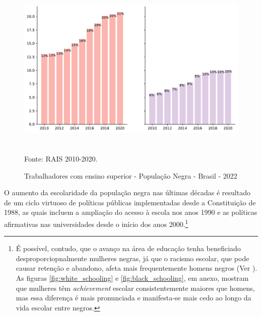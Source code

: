 \documentclass[12pt]{article}
\begin{document}
\begin{figure}[H]
    \centering
    \caption{Trabalhadores com ensino superior - População Negra - Brasil - 2022}
        \includegraphics[height=8cm]{../figures/rais_schooling.pdf}
    \label{fig:rais_schooling}
    \begin{floatnotes}
        \item[Fonte:] RAIS 2010-2020.
    \end{floatnotes}
\end{figure}

\par O aumento da escolaridade da população negra nas últimas décadas é resultado de um ciclo virtuoso de políticas públicas implementadas desde a Constituição de 1988, as quais incluem a ampliação do acesso à escola nos anos 1990 e as políticas afirmativas nas universidades desde o início dos anos 2000.\footnote{É possível, contudo, que o avanço na área de educação tenha beneficiado desproporciopnalmente mulheres negras, já que o racismo escolar, que pode causar retenção e abandono, afeta mais frequentemente homens negros (Ver \autocite{carvalho2004fracasso}). As figuras \ref{fig:white_schooling} e \ref{fig:black_schooling}, em anexo, mostram que mulheres têm \textit{achievement} escolar consistentemente maiores que homens, mas essa diferença é mais pronunciada e manifesta-se mais cedo ao longo da vida escolar entre negros.}
\end{document}
